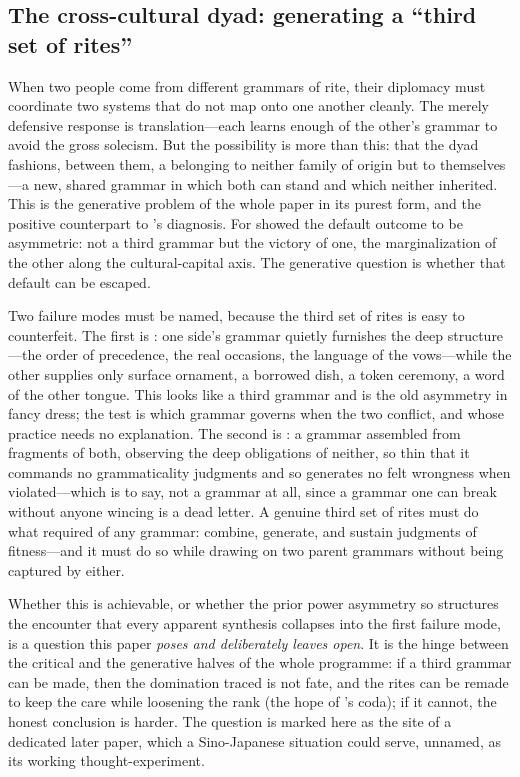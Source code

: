 \subsection{The cross-cultural dyad: generating a ``third set of rites''}\label{p07:sec:thirdrites}
When two people come from different grammars of rite, their diplomacy must coordinate two systems that do not map onto one another cleanly. The merely defensive response is translation---each learns enough of the other's grammar to avoid the gross solecism. But the  possibility is more than this: that the dyad fashions, between them, a  belonging to neither family of origin but to themselves---a new, shared grammar in which both can stand and which neither inherited. This is the generative problem of the whole paper in its purest form, and the positive counterpart to 's diagnosis. For  showed the default outcome to be asymmetric: not a third grammar but the victory of one, the marginalization of the other along the cultural-capital axis. The generative question is whether that default can be escaped.

Two failure modes must be named, because the third set of rites is easy to counterfeit. The first is : one side's grammar quietly furnishes the deep structure---the order of precedence, the real occasions, the language of the vows---while the other supplies only surface ornament, a borrowed dish, a token ceremony, a word of the other tongue. This looks like a third grammar and is the old asymmetry in fancy dress; the test is which grammar governs when the two conflict, and whose practice needs no explanation. The second is : a grammar assembled from fragments of both, observing the deep obligations of neither, so thin that it commands no grammaticality judgments and so generates no felt wrongness when violated---which is to say, not a grammar at all, since a grammar one can break without anyone wincing is a dead letter. A genuine third set of rites must do what  required of any grammar: combine, generate, and sustain judgments of fitness---and it must do so while drawing on two parent grammars without being captured by either.

Whether this is achievable, or whether the prior power asymmetry so structures the encounter that every apparent synthesis collapses into the first failure mode, is a question this paper \emph{poses and deliberately leaves open}. It is the hinge between the critical and the generative halves of the whole programme: if a third grammar can be made, then the domination  traced is not fate, and the rites can be remade to keep the care while loosening the rank (the hope of 's coda); if it cannot, the honest conclusion is harder. The question is marked here as the site of a dedicated later paper, which a Sino-Japanese situation could serve, unnamed, as its working thought-experiment.

